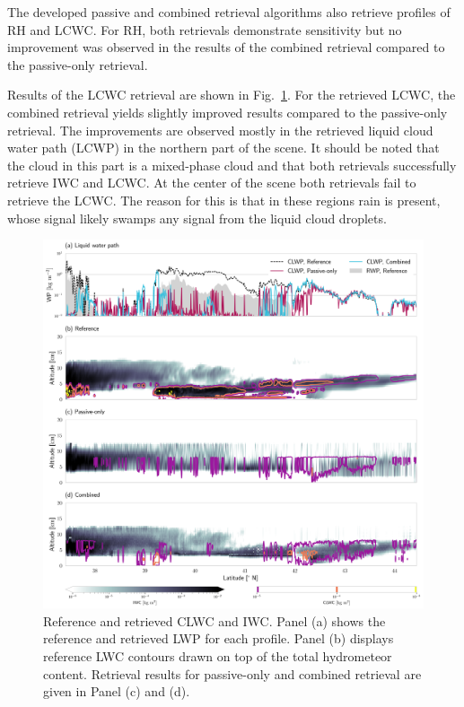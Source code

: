 \documentclass[journal abbreviation, manuscript]{copernicus}
\begin{document}
The developed passive and combined retrieval algorithms also retrieve profiles
of RH and LCWC. For RH, both retrievals demonstrate sensitivity but no
improvement was observed in the results of the combined retrieval compared to
the passive-only retrieval.

Results of the LCWC retrieval are shown in Fig.~\ref{fig:results_cw_b}. For the
retrieved LCWC, the combined retrieval yields slightly improved results compared
to the passive-only retrieval. The improvements are observed mostly in the
retrieved liquid cloud water path (LCWP) in the northern part of the scene. It
should be noted that the cloud in this part is a mixed-phase cloud and that both
retrievals successfully retrieve IWC and LCWC. At the center of the scene both
retrievals fail to retrieve the LCWC. The reason for this is that in these
regions rain is present, whose signal likely swamps any signal from the liquid
cloud droplets.

\begin{figure}
\centering
\includegraphics[width = \textwidth]{../plots/results_cw_b_LargePlateAggregate}
\caption{Reference and retrieved CLWC and IWC. Panel (a) shows the reference and
  retrieved LWP for each profile. Panel (b) displays reference LWC contours
  drawn on top of the total hydrometeor content. Retrieval results for
  passive-only and combined retrieval are given in Panel (c) and (d).}
\label{fig:results_cw_b}
\end{figure}
\end{document}
